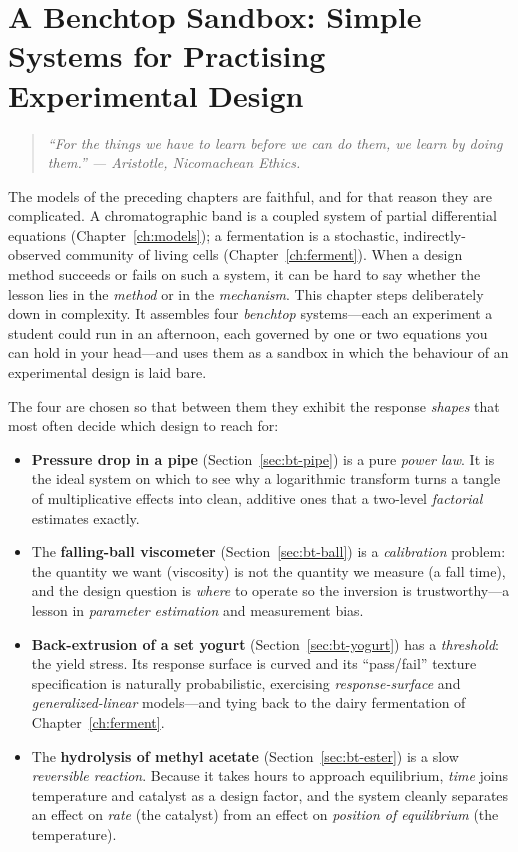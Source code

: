 \chapter{A Benchtop Sandbox: Simple Systems for Practising Experimental Design}
\label{ch:benchtop}

\begin{quote}\itshape
``For the things we have to learn before we can do them, we learn by doing
them.'' --- Aristotle, \emph{Nicomachean Ethics}.
\end{quote}

\noindent
The models of the preceding chapters are faithful, and for that reason they are
complicated. A chromatographic band is a coupled system of partial differential
equations (Chapter~\ref{ch:models}); a fermentation is a stochastic,
indirectly-observed community of living cells (Chapter~\ref{ch:ferment}). When a
design method succeeds or fails on such a system, it can be hard to say whether
the lesson lies in the \emph{method} or in the \emph{mechanism}. This chapter
steps deliberately down in complexity. It assembles four \emph{benchtop}
systems---each an experiment a student could run in an afternoon, each governed
by one or two equations you can hold in your head---and uses them as a sandbox in
which the behaviour of an experimental design is laid bare.

The four are chosen so that between them they exhibit the response \emph{shapes}
that most often decide which design to reach for:

\begin{itemize}
\item \textbf{Pressure drop in a pipe} (Section~\ref{sec:bt-pipe}) is a pure
  \emph{power law}. It is the ideal system on which to see why a logarithmic
  transform turns a tangle of multiplicative effects into clean, additive ones
  that a two-level \emph{factorial} estimates exactly.
\item The \textbf{falling-ball viscometer} (Section~\ref{sec:bt-ball}) is a
  \emph{calibration} problem: the quantity we want (viscosity) is not the
  quantity we measure (a fall time), and the design question is \emph{where} to
  operate so the inversion is trustworthy---a lesson in \emph{parameter
  estimation} and measurement bias.
\item \textbf{Back-extrusion of a set yogurt} (Section~\ref{sec:bt-yogurt}) has a
  \emph{threshold}: the yield stress. Its response surface is curved and its
  ``pass/fail'' texture specification is naturally probabilistic, exercising
  \emph{response-surface} and \emph{generalized-linear} models---and tying back
  to the dairy fermentation of Chapter~\ref{ch:ferment}.
\item The \textbf{hydrolysis of methyl acetate} (Section~\ref{sec:bt-ester}) is a
  slow \emph{reversible reaction}. Because it takes hours to approach
  equilibrium, \emph{time} joins temperature and catalyst as a design factor, and
  the system cleanly separates an effect on \emph{rate} (the catalyst) from an
  effect on \emph{position of equilibrium} (the temperature).
\end{itemize}

